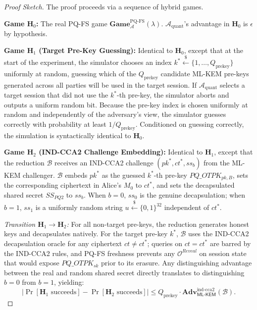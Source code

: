 \documentclass[11pt,a4paper]{article}
\theoremstyle{remark}
\theoremstyle{plain}
\newcommand{\Adv}{\mathbf{Adv}}
\newcommand{\PGame}{\mathbf{Game}}
\newcommand{\calA}{\mathcal{A}}
\newcommand{\calB}{\mathcal{B}}
\newcommand{\calO}{\mathcal{O}}
\newcommand{\bits}{\{0,1\}}
\newcommand{\getsr}{\stackrel{\$}{\leftarrow}}
\newcommand{\MLKEM}{\mathsf{ML\text{-}KEM}}
\newcommand{\Hgame}[1]{\mathbf{H}_{#1}}
\begin{document}
\begin{proof}[Proof Sketch]
The proof proceeds via a sequence of hybrid games.

\medskip\noindent
\textbf{Game $\Hgame{0}$:} The real PQ-FS game $\PGame^{\mathrm{PQ\text{-}FS}}_{\calA}(\lambda)$.
$\calA_{\mathrm{quant}}$'s advantage in $\Hgame{0}$ is $\epsilon$ by hypothesis.

\medskip\noindent
\textbf{Game $\Hgame{1}$ (Target Pre-Key Guessing):} Identical to $\Hgame{0}$, except that at the start of
the experiment, the simulator chooses an index $k^* \getsr \{1, \dots, Q_{\mathrm{prekey}}\}$ uniformly at random,
guessing which of the $Q_{\mathrm{prekey}}$ candidate ML-KEM pre-keys generated across all parties will be used in
the target session.  If $\calA_{\mathrm{quant}}$ selects a target session that did not use the $k^*$-th pre-key,
the simulator aborts and outputs a uniform random bit.  Because the pre-key index is chosen uniformly at random
and independently of the adversary's view, the simulator guesses correctly with probability at least $1/Q_{\mathrm{prekey}}$.
Conditioned on guessing correctly, the simulation is syntactically identical to $\Hgame{0}$.

\medskip\noindent
\textbf{Game $\Hgame{2}$ (IND-CCA2 Challenge Embedding):} Identical to $\Hgame{1}$, except that the reduction $\calB$
receives an IND-CCA2 challenge $(pk^*, ct^*, ss_b)$ from the ML-KEM challenger.  $\calB$ embeds $pk^*$ as the
guessed $k^*$-th pre-key $PQ\_OTPK_{pk,B}$, sets the corresponding ciphertext in Alice's $M_0$ to $ct^*$,
and sets the decapsulated shared secret $SS_{PQ2}$ to $ss_b$.  When $b = 0$, $ss_0$ is the genuine decapsulation;
when $b = 1$, $ss_1$ is a uniformly random string $u \getsr \bits^{32}$ independent of $ct^*$.

\textit{Transition $\Hgame{1} \to \Hgame{2}$:} For all non-target pre-keys, the reduction generates honest keys and
decapsulates natively.  For the target pre-key $k^*$, $\calB$ uses the IND-CCA2 decapsulation oracle for any ciphertext
$ct \neq ct^*$; queries on $ct = ct^*$ are barred by the IND-CCA2 rules, and PQ-FS freshness prevents any $\calO^{Reveal}$
on session state that would expose $PQ\_OTPK_{sk}$ prior to its erasure.  Any distinguishing advantage between the real
and random shared secret directly translates to distinguishing $b=0$ from $b=1$, yielding:
\[
  |\Pr[\Hgame{1}\text{ succeeds}] - \Pr[\Hgame{2}\text{ succeeds}]|
  \leq Q_{\mathrm{prekey}} \cdot \Adv^{\mathrm{ind\text{-}cca2}}_{\MLKEM}(\calB).
\]


\end{proof}
\end{document}
